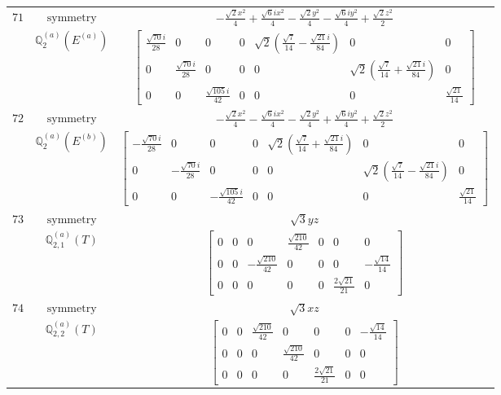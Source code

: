 \documentclass[fleqn,8pt,landscape]{jsarticle}
\begin{document}
\begin{longtable}{ccc}
$ 71 $ & $ \text{symmetry} $ & $ - \frac{\sqrt{2} x^{2}}{4} + \frac{\sqrt{6} i x^{2}}{4} - \frac{\sqrt{2} y^{2}}{4} - \frac{\sqrt{6} i y^{2}}{4} + \frac{\sqrt{2} z^{2}}{2} $ \\
$  $ & $ \mathbb{Q}_{2}^{(a)}(E^{(a)}) $ & $ \begin{bmatrix} \frac{\sqrt{70} i}{28} & 0 & 0 & 0 & \sqrt{2} \left(\frac{\sqrt{7}}{14} - \frac{\sqrt{21} i}{84}\right) & 0 & 0 \\ 0 & \frac{\sqrt{70} i}{28} & 0 & 0 & 0 & \sqrt{2} \left(\frac{\sqrt{7}}{14} + \frac{\sqrt{21} i}{84}\right) & 0 \\ 0 & 0 & \frac{\sqrt{105} i}{42} & 0 & 0 & 0 & \frac{\sqrt{21}}{14} \end{bmatrix} $ \\ \hline
$ 72 $ & $ \text{symmetry} $ & $ - \frac{\sqrt{2} x^{2}}{4} - \frac{\sqrt{6} i x^{2}}{4} - \frac{\sqrt{2} y^{2}}{4} + \frac{\sqrt{6} i y^{2}}{4} + \frac{\sqrt{2} z^{2}}{2} $ \\
$  $ & $ \mathbb{Q}_{2}^{(a)}(E^{(b)}) $ & $ \begin{bmatrix} - \frac{\sqrt{70} i}{28} & 0 & 0 & 0 & \sqrt{2} \left(\frac{\sqrt{7}}{14} + \frac{\sqrt{21} i}{84}\right) & 0 & 0 \\ 0 & - \frac{\sqrt{70} i}{28} & 0 & 0 & 0 & \sqrt{2} \left(\frac{\sqrt{7}}{14} - \frac{\sqrt{21} i}{84}\right) & 0 \\ 0 & 0 & - \frac{\sqrt{105} i}{42} & 0 & 0 & 0 & \frac{\sqrt{21}}{14} \end{bmatrix} $ \\ \hline
$ 73 $ & $ \text{symmetry} $ & $ \sqrt{3} y z $ \\
$  $ & $ \mathbb{Q}_{2,1}^{(a)}(T) $ & $ \begin{bmatrix} 0 & 0 & 0 & \frac{\sqrt{210}}{42} & 0 & 0 & 0 \\ 0 & 0 & - \frac{\sqrt{210}}{42} & 0 & 0 & 0 & - \frac{\sqrt{14}}{14} \\ 0 & 0 & 0 & 0 & 0 & \frac{2 \sqrt{21}}{21} & 0 \end{bmatrix} $ \\ \hline
$ 74 $ & $ \text{symmetry} $ & $ \sqrt{3} x z $ \\
$  $ & $ \mathbb{Q}_{2,2}^{(a)}(T) $ & $ \begin{bmatrix} 0 & 0 & \frac{\sqrt{210}}{42} & 0 & 0 & 0 & - \frac{\sqrt{14}}{14} \\ 0 & 0 & 0 & \frac{\sqrt{210}}{42} & 0 & 0 & 0 \\ 0 & 0 & 0 & 0 & \frac{2 \sqrt{21}}{21} & 0 & 0 \end{bmatrix} $ \\ \hline

\end{longtable}
\end{document}

